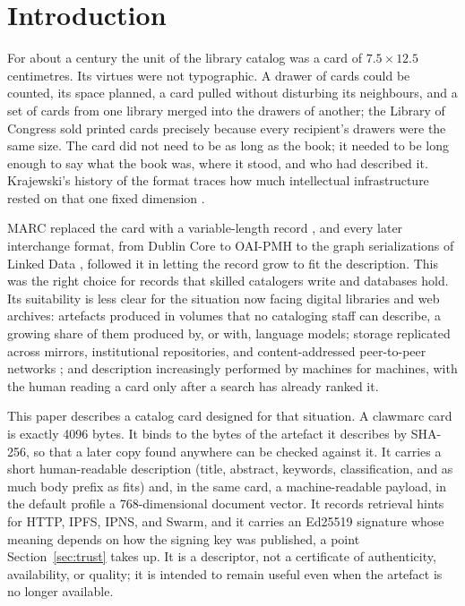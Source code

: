 \documentclass[sigconf]{acmart}
\begin{document}

\maketitle

\section{Introduction}

For about a century the unit of the library catalog was a card of
$7.5 \times 12.5$ centimetres. Its virtues were not typographic. A drawer of
cards could be counted, its space planned, a card pulled without disturbing its
neighbours, and a set of cards from one library merged into the drawers of
another; the Library of Congress sold printed cards precisely because every
recipient's drawers were the same size. The card did not need to be as long as
the book; it needed to be long enough to say what the book was, where it stood,
and who had described it. Krajewski's history of the format traces how much
intellectual infrastructure rested on that one fixed dimension
\cite{Krajewski:2011}.

MARC replaced the card with a variable-length record \cite{Avram:1975}, and
every later interchange format, from Dublin Core \cite{Kunze:2007} to OAI-PMH
\cite{Lagoze:2001} to the graph serializations of Linked Data
\cite{Kellogg:2020}, followed it in letting the record grow to fit the
description. This was the right choice for records that skilled catalogers
write and databases hold. Its suitability is less clear for the situation now
facing digital libraries and web archives: artefacts produced in volumes that
no cataloging staff can describe, a growing share of them produced by, or with,
language models; storage replicated across mirrors, institutional
repositories, and content-addressed peer-to-peer networks
\cite{Benet:2014,Alam:2016}; and description increasingly performed by machines
for machines, with the human reading a card only after a search has already
ranked it.

This paper describes a catalog card designed for that situation. A clawmarc
card is exactly 4096 bytes. It binds to the bytes of the artefact it describes
by SHA-256, so that a later copy found anywhere can be checked against it. It
carries a short human-readable description (title, abstract, keywords,
classification, and as much body prefix as fits) and, in the same card, a
machine-readable payload, in the default profile a 768-dimensional document
vector. It records retrieval hints for HTTP, IPFS, IPNS, and Swarm, and it
carries an Ed25519 signature \cite{Josefsson:2017} whose meaning depends on
how the signing key was published, a point Section~\ref{sec:trust} takes up.
It is a descriptor, not a certificate of authenticity, availability, or
quality; it is intended to remain useful even when the artefact is no longer
available.
\end{document}

